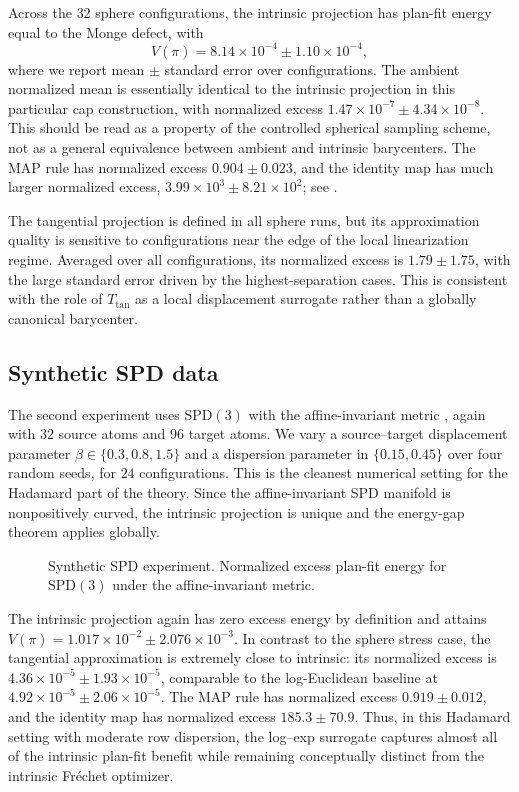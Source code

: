 \documentclass[10pt]{article} %
\theoremstyle{definition}
\providecommand{\1}{\mathbf{1}}
\begin{document}
Across the \(32\) sphere configurations, the intrinsic projection has
plan-fit energy equal to the Monge defect, with
\[
V(\pi)=8.14\times 10^{-4}\pm 1.10\times 10^{-4},
\]
where we report mean \(\pm\) standard error over configurations. The ambient
normalized mean is essentially identical to the intrinsic projection in this
particular cap construction, with normalized excess
\(1.47\times 10^{-7}\pm 4.34\times 10^{-8}\). This should be read as a
property of the controlled spherical sampling scheme, not as a general
equivalence between ambient and intrinsic barycenters. The MAP rule has
normalized excess \(0.904\pm0.023\), and the identity map has much larger
normalized excess, \(3.99\times 10^3\pm8.21\times10^2\); see
.

The tangential projection is defined in all sphere runs, but its approximation
quality is sensitive to configurations near the edge of the local linearization
regime. Averaged over all configurations, its normalized excess is
\(1.79\pm1.75\), with the large standard error driven by the highest-separation
cases. This is consistent with the role of \(T_{\mathrm{tan}}\) as a local
displacement surrogate rather than a globally canonical barycenter.

\subsection{Synthetic SPD data}
The second experiment uses $\mathrm{SPD}(3)$ with the affine-invariant metric \citep{pennec_2006_RiemannianFrameworkTensor}, again with $32$ source atoms and $96$ target atoms. We vary a source--target displacement parameter $\beta\in\{0.3,0.8,1.5\}$ and a dispersion parameter in $\{0.15,0.45\}$ over four random seeds, for $24$ configurations. This is the cleanest numerical setting for the Hadamard part of the theory. Since the affine-invariant SPD manifold is nonpositively curved, the intrinsic projection is unique and the energy-gap theorem applies globally.

\begin{figure}[t]
\centering
\resizebox{0.98\linewidth}{!}{%
	
}
\caption{Synthetic SPD experiment. Normalized excess plan-fit energy for $\mathrm{SPD}(3)$ under the affine-invariant metric.}
\label{fig:spd-excess}
\end{figure}

The intrinsic projection again has zero excess energy by definition and attains $V(\pi)=1.017\times10^{-2}\pm2.076\times10^{-3}$. In contrast to the sphere stress case, the tangential approximation is extremely close to intrinsic: its normalized excess is $4.36\times10^{-5}\pm1.93\times10^{-5}$, comparable to the log-Euclidean baseline at $4.92\times10^{-5}\pm2.06\times10^{-5}$. The MAP rule has normalized excess $0.919\pm0.012$, and the identity map has normalized excess $185.3\pm70.9$. Thus, in this Hadamard setting with moderate row dispersion, the log--exp surrogate captures almost all of the intrinsic plan-fit benefit while remaining conceptually distinct from the intrinsic Fr\'echet optimizer.
\end{document}
